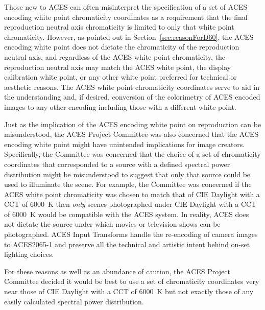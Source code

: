 Those new to ACES can often misinterpret the specification of a set of ACES encoding white point chromaticity coordinates as a requirement that the final reproduction neutral axis chromaticity is limited to only that white point chromaticity.  However, as pointed out in Section~\ref{sec:reasonForD60}, the ACES encoding white point does not dictate the chromaticity of the reproduction neutral axis, and regardless of the ACES white point chromaticity, the reproduction neutral axis may match the ACES white point, the display calibration white point, or any other white point preferred for technical or aesthetic reasons.  The ACES white point chromaticity coordinates serve to aid in the understanding and, if desired, conversion of the colorimetry of ACES encoded images to any other encoding including those with a different white point.

Just as the implication of the ACES encoding white point on reproduction can be misunderstood, the ACES Project Committee was also concerned that the ACES encoding white point might have unintended implications for image creators. Specifically, the Committee was concerned that the choice of a set of chromaticity coordinates that corresponded to a source with a defined spectral power distribution might be misunderstood to suggest that only that source could be used to illuminate the scene.  For example, the Committee was concerned if the ACES white point chromaticity was chosen to match that of CIE Daylight with a CCT of \SI[mode=text]{6000}{\kelvin} then \textit{only} scenes photographed under CIE Daylight with a CCT of \SI[mode=text]{6000}{\kelvin} would be compatible with the ACES system.  In reality, ACES does not dictate the source under which movies or television shows can be photographed.  ACES Input Transforms handle the re-encoding of camera images to ACES2065-1 and preserve all the technical and artistic intent behind on-set lighting choices.  

For these reasons as well as an abundance of caution, the ACES Project Committee decided it would be best to use a set of chromaticity coordinates very near those of CIE Daylight with a CCT of \SI[mode=text]{6000}{\kelvin} but not exactly those of any easily calculated spectral power distribution.